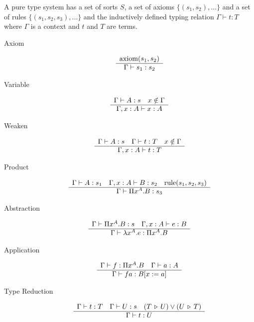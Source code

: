 \documentclass[12pt]{article}
\begin{document}
\begin{definition}
  A pure type system has a set of sorts $S$, a set of axioms
  $\{(s_1,s_2), \ldots\}$ and a set of rules $\{(s_1,s_2,s_3), \ldots \}$ and
  the inductively defined typing relation $\Gamma \vdash t: T$ where $\Gamma$
  is a context and $t$ and $T$ are terms.
  \begin{description}

  \item[Axiom] $$\begin{array}{c}  \text{axiom}(s_1,s_2) \\ \hline \Gamma \vdash s_1:s_2\end{array}$$

  \item[Variable]
    $$\begin{array}{c} \Gamma \vdash A:s\quad x \notin \Gamma \\ \hline \Gamma,x:A \vdash x:A\end{array}$$


  \item[Weaken]
    $$\begin{array}{c} \Gamma \vdash A:s \quad  \Gamma \vdash t:T   \quad x \notin \Gamma \\ \hline \Gamma,x:A \vdash t:T\end{array}$$


  \item[Product]
    $$\begin{array}{c} \Gamma \vdash A:s_1 \quad
      \Gamma,x:A \vdash B:s_2 \quad
      \text{rule}(s_1,s_2,s_3) \\ \hline \Gamma \vdash \Pi x^A . B : s_3\end{array}
    $$

  \item[Abstraction]
    $$\begin{array}{c} \Gamma \vdash \Pi x^A.B: s \quad
      \Gamma,x:A \vdash e:B
     \\ \hline \Gamma \vdash \lambda x^A.e : \Pi x^A . B\end{array}
    $$

  \item[Application]
    $$\begin{array}{c} \Gamma \vdash f: \Pi x^A.B \quad
      \Gamma \vdash a:A
     \\ \hline \Gamma \vdash f a : B[x:=a]\end{array}
    $$

  \item[Type Reduction]
    $$\begin{array}{c} \Gamma \vdash t: T \quad
      \Gamma\vdash U: s \quad
      (T \,\triangleright\, U) \lor (U \,\triangleright\, T)
     \\ \hline \Gamma \vdash t: U\end{array}
    $$
  \end{description}
\end{definition}
\end{document}
